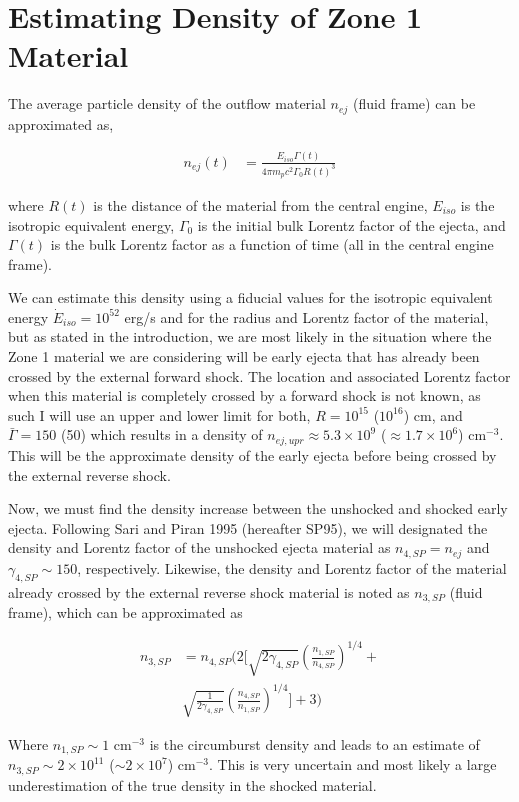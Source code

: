 \documentclass[linenumbers,twocolumn]{aastex631}
\begin{document}
\section{Estimating Density of Zone 1 Material}
{
    The average particle density of the outflow material $n_{ej}$ (fluid frame) can be approximated as,

    \begin{align}
    n_{ej}(t) &= \frac{E_{iso}\Gamma(t)}{4\pi m_p c^2 \Gamma_0 R(t)^3} \label{eq: dens estim}
    \end{align}

    where $R(t)$ is the distance of the material from the central engine, $E_{iso}$ is the isotropic equivalent energy, $\Gamma_0$ is the initial bulk Lorentz factor of the ejecta, and $\Gamma(t)$ is the bulk Lorentz factor as a function of time (all in the central engine frame).

    We can estimate this density using a fiducial values for the isotropic equivalent energy $\dot{E}_{iso} = 10^{52}$ erg/s and for the radius and Lorentz factor of the material, but as stated in the introduction, we are most likely in the situation where the Zone 1 material we are considering will be early ejecta that has already been crossed by the external forward shock. The location and associated Lorentz factor when this material is completely crossed by a forward shock is not known, as such I will use an upper and lower limit for both, $R=10^{15}$ ($10^{16}$) cm, and $\bar{\Gamma} = 150$ (50) which results in a density of $n_{ej,upr} \approx 5.3\times 10^{9}$ ($\approx 1.7\times 10^{6}$) cm$^{-3}$. This will be the approximate density of the early ejecta before being crossed by the external reverse shock.

    Now, we must find the density increase between the unshocked and shocked early ejecta. Following Sari and Piran 1995 (hereafter SP95), we will designated the density and Lorentz factor of the unshocked ejecta material as $n_{4,SP} = n_{ej}$ and $\gamma_{4,SP} \sim 150$, respectively. Likewise, the density and Lorentz factor of the material already crossed by the external reverse shock material is noted as $n_{3,SP}$ (fluid frame), which can be approximated as

    \begin{align}
        n_{3,SP} &= n_{4,SP}\bigg(2\bigg[\sqrt{2\gamma_{4,SP}} \left(\frac{n_{1,SP}}{n_{4,SP}}\right)^{1/4}+\nonumber\\ 
        & \sqrt{\frac{1}{2\gamma_{4,SP}}} \left(\frac{n_{4,SP}}{n_{1,SP}}\right)^{1/4} \bigg] + 3\bigg)
    \end{align}

    Where $n_{1,SP} \sim 1 $ cm$^{-3}$ is the circumburst density and leads to an estimate of $n_{3,SP} \sim 2\times10^{11}$ ($\sim 2\times10^{7}$) cm$^{-3}$. This is very uncertain and most likely a large underestimation of the true density in the shocked material.
}
\end{document}
